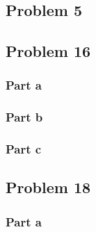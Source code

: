 \documentclass{article}%
\begin{document}
\subsection*{Problem 5}


\subsection*{Problem 16}

\subsubsection*{Part a}
\subsubsection*{Part b}
\subsubsection*{Part c}

\subsection*{Problem 18}

\subsubsection*{Part a}
\end{document}
